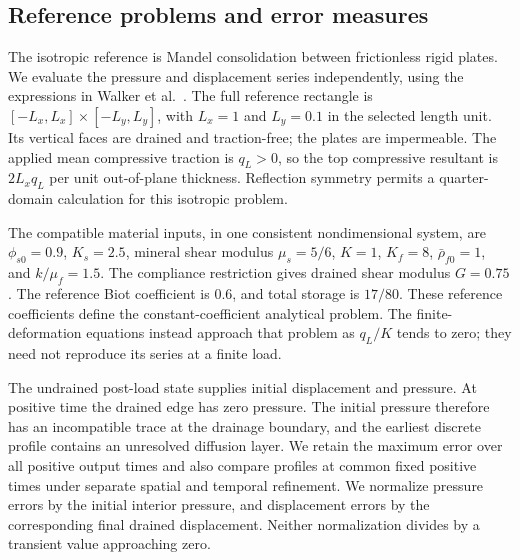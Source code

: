 \subsection{Reference problems and error measures}
\label{sec:fe-reference-problems}

The isotropic reference is Mandel consolidation between frictionless rigid
plates. We evaluate the pressure and displacement series independently,
using the expressions in Walker et al.~\cite[appendix D]{walker2023poroelasticity}.
The full reference rectangle is \([-L_x,L_x]\times[-L_y,L_y]\), with
\(L_x=1\) and \(L_y=0.1\) in the selected length unit. Its vertical faces are
drained and traction-free; the plates are impermeable. The applied mean
compressive traction is \(q_L>0\), so the top compressive resultant is
\(2L_x q_L\) per unit out-of-plane thickness. Reflection symmetry permits
a quarter-domain calculation for this isotropic problem.

The compatible material inputs, in one consistent nondimensional system,
are \(\phi_{s0}=0.9\), \(K_s=2.5\), mineral shear modulus
\(\mu_s=5/6\), \(K=1\), \(K_f=8\),
\(\bar\rho_{f0}=1\), and \(k/\mu_f=1.5\).
The compliance restriction gives drained shear modulus \(G=0.75\).
The reference Biot coefficient is \(0.6\), and total storage is
\(17/80\). These reference coefficients define the constant-coefficient
analytical problem. The finite-deformation equations instead approach that
problem as \(q_L/K\) tends to zero; they need not reproduce its series
at a finite load.

The undrained post-load state supplies initial displacement and pressure.
At positive time the drained edge has zero pressure. The initial pressure
therefore has an incompatible trace at the drainage boundary, and the
earliest discrete profile contains an unresolved diffusion layer.
We retain the maximum error over all positive output times and also compare
profiles at common fixed positive times under separate spatial and temporal
refinement. We normalize pressure errors by the initial interior pressure,
and displacement errors by the corresponding final drained displacement.
Neither normalization divides by a transient value approaching zero.

